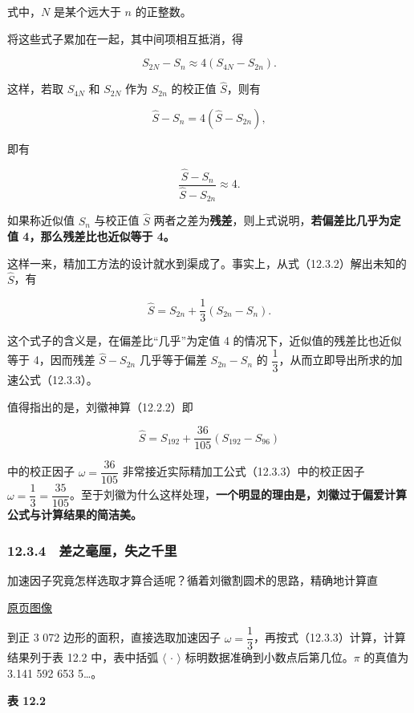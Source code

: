 \documentclass[
  10pt,
  fontset=fandol]{ctexart}
\begin{document}
式中，\(N\) 是某个远大于 \(n\) 的正整数。

将这些式子累加在一起，其中间项相互抵消，得

\[
S_{2N}-S_n\approx4(S_{4N}-S_{2n}).
\]

这样，若取 \(S_{4N}\) 和 \(S_{2N}\) 作为 \(S_{2n}\) 的校正值 \(\widehat S\)，则有

\[
\widehat S-S_n=4(\widehat S-S_{2n}),
\tag{12.3.2}
\]

即有

\[
\frac{\widehat S-S_n}{\widehat S-S_{2n}}\approx4.
\]

如果称近似值 \(S_n\) 与校正值 \(\widehat S\) 两者之差为\textbf{残差}，则上式说明，\textbf{若偏差比几乎为定值 4，那么残差比也近似等于 4。}

这样一来，精加工方法的设计就水到渠成了。事实上，从式（12.3.2）解出未知的 \(\widehat S\)，有

\[
\widehat S=S_{2n}+\frac{1}{3}(S_{2n}-S_n).
\tag{12.3.3}
\]

这个式子的含义是，在偏差比``几乎''为定值 4 的情况下，近似值的残差比也近似等于 4，因而残差 \(\widehat S-S_{2n}\) 几乎等于偏差 \(S_{2n}-S_n\) 的 \(\dfrac13\)，从而立即导出所求的加速公式（12.3.3）。

值得指出的是，刘徽神算（12.2.2）即

\[
\widehat S=S_{192}+\frac{36}{105}(S_{192}-S_{96})
\]

中的校正因子 \(\omega=\dfrac{36}{105}\) 非常接近实际精加工公式（12.3.3）中的校正因子 \(\omega=\dfrac13=\dfrac{35}{105}\)。至于刘徽为什么这样处理，\textbf{一个明显的理由是，刘徽过于偏爱计算公式与计算结果的简洁美。}

\subsubsection{12.3.4　差之毫厘，失之千里}\label{ux5deeux4e4bux6bebux5398ux5931ux4e4bux5343ux91cc}

加速因子究竟怎样选取才算合适呢？循着刘徽割圆术的思路，精确地计算直

\href{../../source-images/pdf-301.jpeg}{原页图像}

到正 3 072 边形的面积，直接选取加速因子 \(\omega=\dfrac13\)，再按式（12.3.3）计算，计算结果列于表 12.2 中，表中括弧 \(\langle\,\cdot\,\rangle\) 标明数据准确到小数点后第几位。\(\pi\) 的真值为 3.141 592 653 5\ldots。

\textbf{表 12.2}
\end{document}
